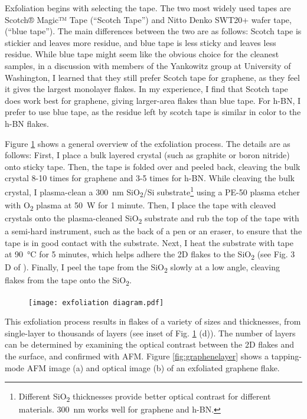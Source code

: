 \documentclass[double,12pt,1in]{beavtex}
\begin{document}
Exfoliation begins with selecting the tape. The two most widely used tapes are Scotch® Magic™ Tape (“Scotch Tape”) and Nitto Denko SWT20+ wafer tape, (“blue tape”). The main differences between the two are as follows: Scotch tape is stickier and leaves more residue, and blue tape is less sticky and leaves less residue. While blue tape might seem like the obvious choice for the cleanest samples, in a discussion with members of the Yankowitz group at University of Washington, I learned that they still prefer Scotch tape for graphene, as they feel it gives the largest monolayer flakes. In my experience, I find that Scotch tape does work best for graphene, giving larger-area flakes than blue tape. For h-BN, I prefer to use blue tape, as the residue left by scotch tape is similar in color to the h-BN flakes.

Figure \ref{exfoliation diagram} shows a general overview of the exfoliation process. The details are as follows: First, I place a bulk layered crystal (such as graphite or boron nitride) onto sticky tape. Then, the tape is folded over and peeled back, cleaving the bulk crystal 8-10 times for graphene and 3-5 times for h-BN. While cleaving the bulk crystal, I plasma-clean a \SI{300}{\nano\meter} SiO\textsubscript{2}/Si substrate\footnote{Different SiO\textsubscript{2} thicknesses provide better optical contrast for different materials. \SI{300}{\nano\meter} works well for graphene and h-BN.} using a PE-50 plasma etcher with O\textsubscript{2} plasma at \SI{50}{\watt} for 1 minute. Then, I place the tape with cleaved crystals onto the plasma-cleaned SiO\textsubscript{2} substrate and rub the top of the tape with a semi-hard instrument, such as the back of a pen or an eraser, to ensure that the tape is in good contact with the substrate. Next, I heat the substrate with tape at \SI{90}{\celsius} for 5 minutes, which helps adhere the 2D flakes to the SiO\textsubscript{2} (see Fig. 3 D of \cite{islam_exfoliation_2022}). Finally, I peel the tape from the SiO\textsubscript{2} slowly at a low angle, cleaving flakes from the tape onto the SiO\textsubscript{2}. 


\begin{figure}
    \texttt{[image: exfoliation diagram.pdf]}
    \caption{}
    \label{exfoliation diagram}
\end{figure}
This exfoliation process results in flakes of a variety of sizes and thicknesses, from single-layer to thousands of layers (see inset of Fig. \ref{exfoliation diagram} (d)). The number of layers can be determined by examining the optical contrast between the 2D flakes and the surface, and confirmed with AFM. Figure \ref{fig:graphenelayer} shows a tapping-mode AFM image (a) and optical image (b) of an exfoliated graphene flake.
\end{document}
